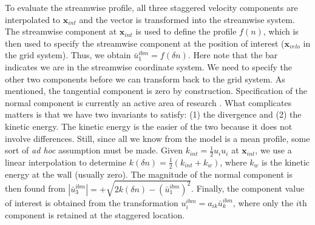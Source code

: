 \documentclass[12pt]{article}
\begin{document}
To evaluate the streamwise profile, all three staggered velocity components are interpolated to $\mathbf{x}_{int}$ and the vector is transformed into the streamwise system.  The streamwise component at $\mathbf{x}_{int}$ is used to define the profile $f(n)$, which is then used to specify the streamwise component at the position of interest ($\mathbf{x}_{velo}$ in the grid system).  Thus, we obtain $\bar{u}_1^{ibm} = f(\delta n)$.  Here note that the bar indicates we are in the streamwise coordinate system.  We need to specify the other two components before we can transform back to the grid system.  As mentioned, the tangential component is zero by construction. Specification of the normal component is currently an active area of research \cite{Choi:2007:temp}.  What complicates matters is that we have two invariants to satisfy: (1) the divergence and (2) the kinetic energy. The kinetic energy is the easier of the two because it does not involve differences.  Still, since all we know from the model is a mean profile, some sort of \emph{ad hoc} assumption must be made.  Given $k_{int}=\frac{1}{2}u_i u_i$ at $\mathbf{x}_{int}$, we use a linear interpolation to determine $k(\delta n) = \frac{1}{2}(k_{int} + k_w)$, where $k_w$ is the kinetic energy at the wall (usually zero).  The magnitude of the normal component is then found from $|\bar{u}_3^{ibm}| = +\sqrt{2k(\delta n) - (\bar{u}_1^{ibm})^2}$.  Finally, the component value of interest is obtained from the transformation $u_i^{ibm} = a_{ik} \bar{u}_k^{ibm}$, where only the $i$th component is retained at the staggered location.
\end{document}
